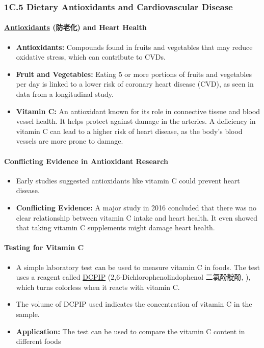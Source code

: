 
\subsubsection{1C.5 Dietary Antioxidants and Cardiovascular Disease}
\paragraph{\underline{Antioxidants} (防老化) and Heart Health}
\begin{itemize}
    \item \textbf{Antioxidants:} Compounds found in fruits and vegetables that may reduce oxidative stress, which can contribute
    to CVDs.
    \item \textbf{Fruit and Vegetables:} Eating 5 or more portions of fruits and vegetables per day is linked to a lower risk of
    coronary heart disease (CVD), as seen in data from a longitudinal study.
    \item \textbf{Vitamin C:} An antioxidant known for its role in connective tissue and blood vessel health. It helps protect
    against damage in the arteries. A deficiency in vitamin C can lead to a higher risk of heart disease, as the body's blood
    vessels are more prone to damage.
\end{itemize}

\paragraph{Conflicting Evidence in Antioxidant Research}
\begin{itemize}
    \item Early studies suggested antioxidants like vitamin C could prevent heart disease.
    \item \textbf{Conflicting Evidence:} A major study in 2016 concluded that there was no clear relationship between vitamin C
    intake and heart health. It even showed that taking vitamin C supplements might damage heart health.
\end{itemize}

\paragraph{Testing for Vitamin C}
\begin{itemize}
    \item A simple laboratory test can be used to measure vitamin C in foods. The test uses a reagent called \underline{DCPIP}
    (2,6-Dichlorophenolindophenol 二氯酚靛酚, ), which turns colorless when it reacts with vitamin C.
    \item The volume of DCPIP used indicates the concentration of vitamin C in the sample.
    \item \textbf{Application:} The test can be used to compare the vitamin C content in different foods
\end{itemize}